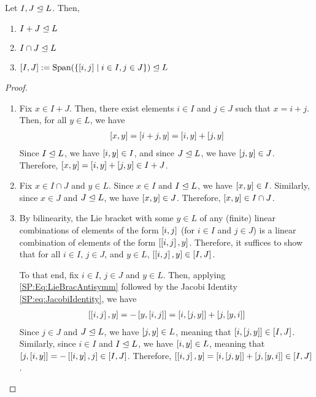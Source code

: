 \begin{boxproposition}\label{Ch1:Prop:IdealBhv}
    Let $I, J \trianglelefteq L$. Then,
    \begin{enumerate}[label = \normalfont\arabic*., noitemsep]
        \item $I + J \trianglelefteq L$
        \item $I \cap J \trianglelefteq L$
        \item $\left[ I, J \right] := \operatorname{Span}\!\left( \left\{ \left[ i, j \right] \; \middle\vert \; i \in I, j \in J \right\} \right) \trianglelefteq L$
    \end{enumerate}
\end{boxproposition}
\begin{proof}
    \hfill
    \begin{enumerate}
        \item Fix $x \in I + J$. Then, there exist elements $i \in I$ and $j \in J$ such that $x = i + j$. Then, for all $y \in L$, we have
        \begin{align*}
            \left[ x, y \right] = \left[ i + j, y \right] = \left[ i, y \right] + \left[ j, y \right]
        \end{align*}
        Since $I \trianglelefteq L$, we have $\left[ i, y \right] \in I$, and since $J \trianglelefteq L$, we have $\left[ j, y \right] \in J$. Therefore, $\left[ x, y \right] = \left[ i, y \right] + \left[ j, y \right] \in I + J$.

        \item Fix $x \in I \cap J$ and $y \in L$. Since $x \in I$ and $I \trianglelefteq L$, we have $\left[ x, y \right] \in I$. Similarly, since $x \in J$ and $J \trianglelefteq L$, we have $\left[ x, y \right] \in J$. Therefore, $\left[ x, y \right] \in I \cap J$.
        
        \item By bilinearity, the Lie bracket with some $y \in L$ of any (finite) linear combinations of elements of the form $\left[ i, j \right]$ (for $i \in I$ and $j \in J$) is a linear combination of elements of the form $\left[ \left[ i, j \right], y \right]$. Therefore, it suffices to show that for all $i \in I$, $j \in J$, and $y \in L$, $\left[ \left[ i, j \right], y \right] \in \left[ I, J \right]$.
        
        To that end, fix $i \in I$, $j \in J$ and $y \in L$. Then, applying \eqref{SP:Eq:LieBracAntisymm} followed by the Jacobi Identity \eqref{SP:eq:JacobiIdentity}, we have
        \begin{align*}
            \left[ \left[ i, j \right], y \right] = -\left[ y, \left[ i, j \right] \right] = \left[ i, \left[ j, y \right] \right] + \left[ j, \left[ y, i \right] \right]
        \end{align*}
        Since $j \in J$ and $J \trianglelefteq L$, we have $\left[ j, y \right] \in L$, meaning that $\left[ i, \left[ j, y \right] \right] \in \left[ I, J \right]$. Similarly, since $i \in I$ and $I \trianglelefteq L$, we have $\left[ i, y \right] \in L$, meaning that $\left[ j, \left[ i, y \right] \right] = -\left[ \left[ i, y \right], j \right] \in \left[ I, J \right]$. Therefore, $\left[ \left[ i, j \right], y \right] = \left[ i, \left[ j, y \right] \right] + \left[ j, \left[ y, i \right] \right] \in \left[ I, J \right]$.
    \end{enumerate}
\end{proof}

